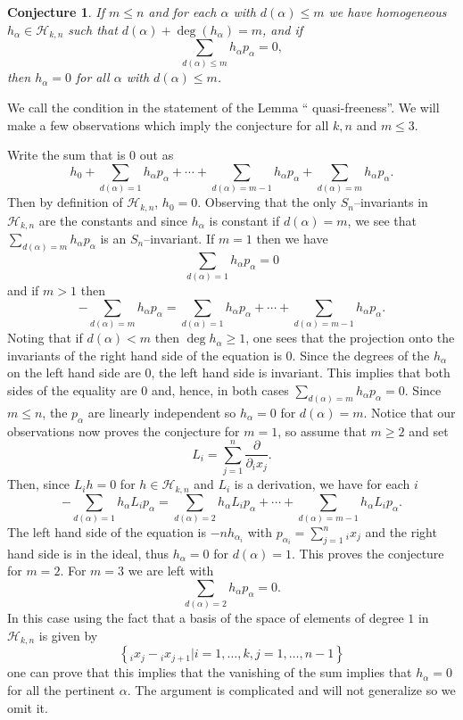 \documentclass[12pt]{article}%
\newtheorem{conjecture}[theorem]{Conjecture}
\begin{document}
\begin{conjecture}
If $m\leq n$ and for each $\alpha$ with $d(\alpha)\leq m$ we have homogeneous
$h_{\alpha}\in\mathcal{H}_{k,n}$ such that $d(\alpha)+\deg(h_{\alpha})=m$, and
if
\[
\sum_{d(\alpha)\leq m}h_{\alpha}p_{\alpha}=0,
\]
then $h_{\alpha}=0$ for all $\alpha$ with $d(\alpha)\leq m$.
\end{conjecture}

We call the condition in the statement of the Lemma \textquotedblleft
quasi-freeness\textquotedblright. We will make a few observations which imply
the conjecture for all $k,n$ and $m\leq3$.

Write the sum that is $0$ out as%
\[
h_{0}+\sum_{d(\alpha)=1}h_{\alpha}p_{\alpha}+\cdots+\sum_{d(\alpha)=m-1}%
h_{\alpha}p_{\alpha}+\sum_{d(\alpha)=m}h_{\alpha}p_{\alpha}.
\]
Then by definition of $\mathcal{H}_{k,n}$, $h_{0}=0.$ Observing that the only
$S_{n}$--invariants in $\mathcal{H}_{k,n}$ are the constants and since
$h_{\alpha}$ is constant if $d(\alpha)=m$, we see that $\sum_{d(\alpha
)=m}h_{\alpha}p_{\alpha}$ is an $S_{n}$--invariant. If $m=1$ then we have
\[
\sum_{d(\alpha)=1}h_{\alpha}p_{\alpha}=0
\]
and if $m>1$ then
\[
-\sum_{d(\alpha)=m}h_{\alpha}p_{\alpha}=\sum_{d(\alpha)=1}h_{\alpha}%
p_{\alpha}+\cdots+\sum_{d(\alpha)=m-1}h_{\alpha}p_{\alpha}.
\]
Noting that if $d(\alpha)<m$ then $\deg h_{\alpha}\geq1$, one sees that the
projection onto the invariants of the right hand side of the equation is $0$.
Since the degrees of the $h_{\alpha}$ on the left hand side are $0$, the left
hand side is invariant. This implies that both sides of the equality are $0$
and, hence, in both cases $\sum_{d(\alpha)=m}h_{\alpha}p_{\alpha}=0$. Since
$m\leq n$, the $p_{\alpha}$ are linearly independent so $h_{\alpha}=0$ for
$d(\alpha)=m$. Notice that our observations now proves the conjecture for
$m=1$, so assume that $m\geq2$ and set
\[
L_{i}=\sum_{j=1}^{n}\frac{\partial}{\partial{}_{i}x_{j}}.
\]
Then, since $L_{i}h=0$ for $h\in\mathcal{H}_{k,n}$ and $L_{i}$ is a
derivation, we have for each $i$%
\[
-\sum_{d(\alpha)=1}h_{\alpha}L_{i}p_{\alpha}=\sum_{d(\alpha)=2}h_{\alpha
}L_{i}p_{\alpha}+\cdots+\sum_{d(\alpha)=m-1}h_{\alpha}L_{i}p_{\alpha}.
\]
The left hand side of the equation is $-nh_{\alpha_{i}}$ with $p_{\alpha_{i}%
}=\sum_{j=1}^{n}{}_{i}x_{j}$ and the right hand side is in the ideal, thus
$h_{\alpha}=0$ for $d(\alpha)=1$. This proves the conjecture for $m=2$. For
$m=3$ we are left with%
\[
\sum_{d(\alpha)=2}h_{\alpha}p_{\alpha}=0.
\]
In this case using the fact that a basis of the space of elements of degree
$1$ in $\mathcal{H}_{k,n}$ is given by
\[
\left\{  {}_{i}x_{j}-{}_{i}x_{j+1}|i=1,\dots,k, j=1,\dots,n-1\right\}
\]
one can prove that this implies that the vanishing of the sum implies that
$h_{\alpha}=0$ for all the pertinent $\alpha$. The argument is complicated and
will not generalize so we omit it.
\end{document}
